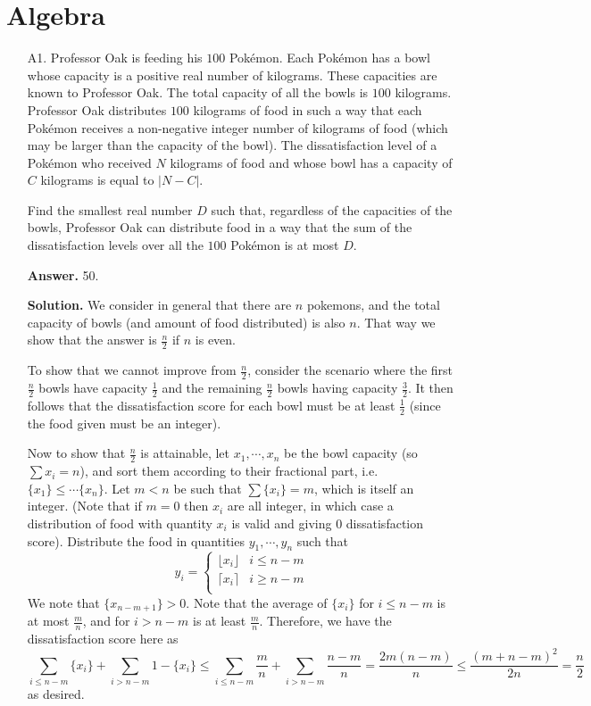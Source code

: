 \documentclass[11pt,a4paper]{article}
\begin{document}
	\section*{Algebra}
	\begin{enumerate}
		\item [A1.] 
		Professor Oak is feeding his $100$ Pokémon. Each Pokémon has a bowl whose capacity is a positive real number of kilograms. These capacities are known to Professor Oak. The total capacity of all the bowls is $100$ kilograms. Professor Oak distributes $100$ kilograms of food in such a way that each Pokémon receives a non-negative integer number of kilograms of food (which may be larger than the capacity of the bowl). The dissatisfaction level of a Pokémon who received $N$ kilograms of food and whose bowl has a capacity of $C$ kilograms is equal to $\lvert N-C\rvert$.
		
		Find the smallest real number $D$ such that, regardless of the capacities of the bowls, Professor Oak can distribute food in a way that the sum of the dissatisfaction levels over all the $100$ Pokémon is at most $D$.
		
		\textbf{Answer.} 50. 
		
		\textbf{Solution.} 
		We consider in general that there are $n$ pokemons, and the total capacity of bowls (and amount of food distributed) is also $n$. 
		That way we show that the answer is $\frac{n}{2}$ if $n$ is even. 
		
		To show that we cannot improve from $\frac n2$, consider the scenario where the first $\frac n2$ bowls have capacity $\frac{1}{2}$ and the remaining $\frac n2$ bowls having capacity $\frac 32$. 
		It then follows that the dissatisfaction score for each bowl must be at least $\frac 12$ (since the food given must be an integer). 
		
		Now to show that $\frac n2$ is attainable, let $x_1, \cdots, x_n$ be the bowl capacity 
		(so $\sum x_i = n$), 
		and sort them according to their fractional part, 
		i.e. 
		$\{x_1\}\le \cdots \{x_n\}$. 
		Let $m < n$ be such that 
		$\sum \{x_i\} = m$, 
		which is itself an integer. 
		(Note that if $m = 0$ then $x_i$ are all integer, in which case a distribution of food with quantity $x_i$ is valid and giving 0 dissatisfaction score). 
		Distribute the food in quantities $y_1, \cdots, y_n$ such that 
		\[
		y_i = 
		\begin{cases}
			\lfloor x_i\rfloor & i\le n - m\\
			\lceil x_i\rceil & i\ge n - m\\
		\end{cases}
		\]
		We note that $\{x_{n - m + 1}\} > 0$. 
		Note that the average of 
		$\{x_i\}$ for $i\le n - m$ is at most $\frac{m}{n}$, 
		and for $i > n - m$ is at least $\frac{m}{n}$. 
		Therefore, we have the dissatisfaction score here as 
		\[
		\sum_{i\le n - m} \{x_i\}
		+\sum_{i > n - m} 1 - \{x_i\}
		\le \sum_{i\le n - m} \frac{m}{n}
		+\sum_{i > n - m} \frac{n-m}{n}
		=\frac{2m(n - m)}{n}
		\le\frac{(m + n - m)^2}{2n}
		=\frac{n}{2}
		\]
		as desired. 
		

\end{enumerate}
\end{document}
